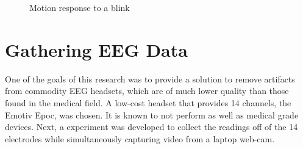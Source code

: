 \documentclass{acm_proc_article-sp}
\begin{document}
\begin{figure}
  \hfill
  \caption{Motion response to a blink}\label{fig:MotionSignal}
\end{figure}

\section{Gathering EEG Data}
One of the goals of this research was to provide a solution to remove
artifacts from commodity EEG headsets, which are of much lower quality
than those found in the medical field. A low-cost headset that
provides 14 channels, the Emotiv Epoc, was chosen. It is known to not
perform as well as medical grade devices\cite{duvinage2013}. Next, a
experiment was developed to collect the readings off of the 14
electrodes while simultaneously capturing video from a laptop web-cam.
\end{document}
